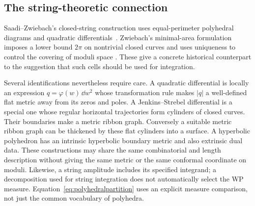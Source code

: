 \subsection{The string-theoretic connection}

Saadi--Zwiebach's closed-string construction uses equal-perimeter polyhedral
diagrams and quadratic differentials~\cite{SaadiZwiebach}. Zwiebach's
minimal-area formulation imposes a lower bound $2\pi$ on nontrivial closed
curves and uses uniqueness to control the covering of moduli space
\cite{Zwiebach}. These give a concrete historical counterpart to the
suggestion that such cells should be used for integration.

Several identifications nevertheless require care. A quadratic differential is locally an expression $q=\varphi(w)\,\dd w^2$
whose transformation rule makes $|q|$ a well-defined flat metric away
from its zeros and poles. A Jenkins--Strebel differential is a special
one whose regular horizontal trajectories form cylinders of closed
curves. Their boundaries make a metric ribbon graph. Conversely a
suitable metric ribbon graph can be thickened by these flat cylinders
into a surface.
A hyperbolic polyhedron has an intrinsic hyperbolic boundary metric and also
extrinsic dual data. These constructions may share the same combinatorial
and length description without giving the same metric or the same conformal
coordinate on moduli. Likewise, a string amplitude includes its specified
integrand; a decomposition used for string integration does not automatically
select the WP measure. Equation~\eqref{eq:polyhedralpartition} uses an
explicit measure comparison, not just the common vocabulary of polyhedra.


